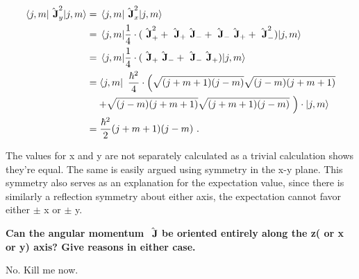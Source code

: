 \begin{alphaparts}
\begin{align}
    \expectationvalue{\Angularmomentum_y ^2}{j, m} &= \expectationvalue{\Angularmomentum_x ^2}{j, m} \\
    &= \expectationvalue{\frac{1}{4} \cdot (\Angularmomentum_+ ^2 + \Angularmomentum_+ \Angularmomentum_-
            + \Angularmomentum_- \Angularmomentum_+ + \Angularmomentum_- ^2)}{j, m} \\
    &= \expectationvalue{\frac{1}{4} \cdot (\Angularmomentum_+ \Angularmomentum_-
            + \Angularmomentum_- \Angularmomentum_+)}{j, m} \\
    &= \bra{j, m}~\frac{\hbar ^2}{4} \cdot \left(\sqrt{(j + m + 1)(j - m)}\sqrt{(j - m)(j + m + 1)} \right.\nonumber \\
        &\quad\left. + \sqrt{(j - m)(j + m + 1)}\sqrt{(j + m + 1)(j - m)}~\right) \cdot \ket{j, m} \\
    &= \frac{\hbar ^ 2}{2}(j + m + 1)(j - m)~.
\end{align}

The values for x and y are not separately calculated as a trivial calculation shows they're equal. The 
same is easily argued using symmetry in the x-y plane. This symmetry also serves as an explanation for the
expectation value, since there is similarly a reflection symmetry about either axis, the expectation cannot
favor either $\pm$ x or $\pm$ y.

\questionpart \textbf{Can the angular momentum $\hat{\textbf{~J}}$ be oriented entirely along 
the z( or x or y) axis?  Give reasons in either case.}

No. Kill me now.

\end{alphaparts}